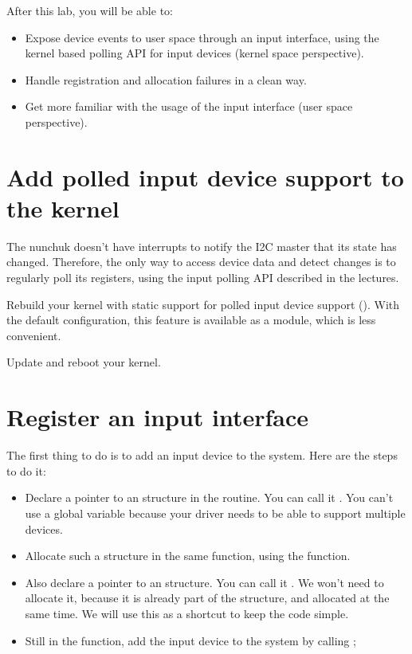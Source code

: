 
After this lab, you will be able to:

\begin{itemize}
\item Expose device events to user space through an input interface,
      using the kernel based polling API for input devices
      (kernel space perspective).
\item Handle registration and allocation failures in a clean
      way.
\item Get more familiar with the usage of the input interface
      (user space perspective).
\end{itemize}

\section{Add polled input device support to the kernel}

The nunchuk doesn't have interrupts to notify the I2C master that 
its state has changed. Therefore, the only way to access device data
and detect changes is to regularly poll its registers, using the input
polling API described in the lectures.

Rebuild your kernel with static support for polled input device support
(). With the default configuration, this
feature is available as a module, which is less convenient.

Update and reboot your kernel.

\section{Register an input interface}

The first thing to do is to add an input device to the system. Here are
the steps to do it:

\begin{itemize}
\item Declare a pointer to an  structure in the
       routine. You can call it .
      You can't use a global variable because your driver needs to be
      able to support multiple devices.
\item Allocate such a structure in the same function, using the
       function. 
\item Also declare a pointer to an  structure. You can 
      call it . We won't need to allocate it, because it
      is already part of the  structure,
      and allocated at the same time.
      We will use this as a shortcut to keep the code simple.
\item Still in the  function, add the input device to
      the system by calling ;
\end{itemize}

